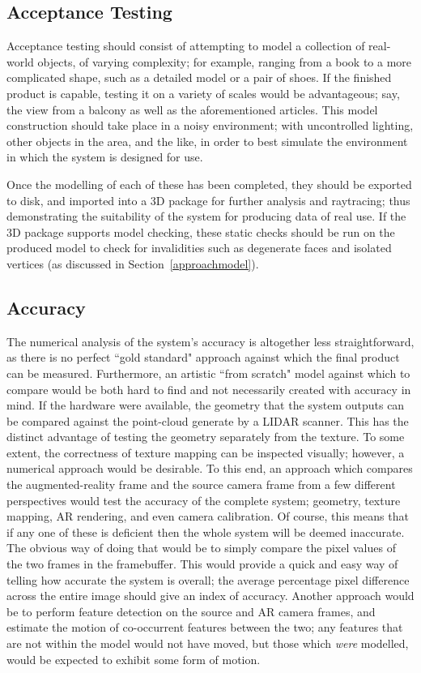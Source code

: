 \documentclass[a4paper,10pt]{article}
\begin{document}
\subsection{Acceptance Testing}
Acceptance testing should consist of attempting to model a collection of real-world objects, of varying complexity; for example, ranging from a book to a more complicated shape, such as a detailed model or a pair of shoes. If the finished product is capable, testing it on a variety of scales would be advantageous; say, the view from a balcony as well as the aforementioned articles. This model construction should take place in a noisy environment; with uncontrolled lighting, other objects in the area, and the like, in order to best simulate the environment in which the system is designed for use. 

Once the modelling of each of these has been completed, they should be exported to disk, and imported into a 3D package for further analysis and raytracing; thus demonstrating the suitability of the system for producing data of real use. If the 3D package supports model checking, these static checks should be run on the produced model to check for invalidities such as degenerate faces and isolated vertices (as discussed in Section~\ref{approachmodel}).

\subsection{Accuracy}
The numerical analysis of the system's accuracy is altogether less straightforward, as there is no perfect ``gold standard" approach against which the final product can be measured. Furthermore, an artistic ``from scratch" model against which to compare would be both hard to find and not necessarily created with accuracy in mind. If the hardware were available, the geometry that the system outputs can be compared against the point-cloud generate by a LIDAR scanner. This has the distinct advantage of testing the geometry separately from the texture. To some extent, the correctness of texture mapping can be inspected visually; however, a numerical approach would be desirable. To this end, an approach which compares the augmented-reality frame and the source camera frame from a few different perspectives would test the accuracy of the complete system; geometry, texture mapping, AR rendering, and even camera calibration. Of course, this means that if any one of these is deficient then the whole system will be deemed inaccurate. The obvious way of doing that would be to simply compare the pixel values of the two frames in the framebuffer. This would provide a quick and easy way of telling how accurate the system is overall; the average percentage pixel difference across the entire image should give an index of accuracy. Another approach would be to perform feature detection on the source and AR camera frames, and estimate the motion of co-occurrent features between the two; any features that are not within the model would not have moved, but those which \textit{were} modelled, would be expected to exhibit some form of motion. 
\end{document}
